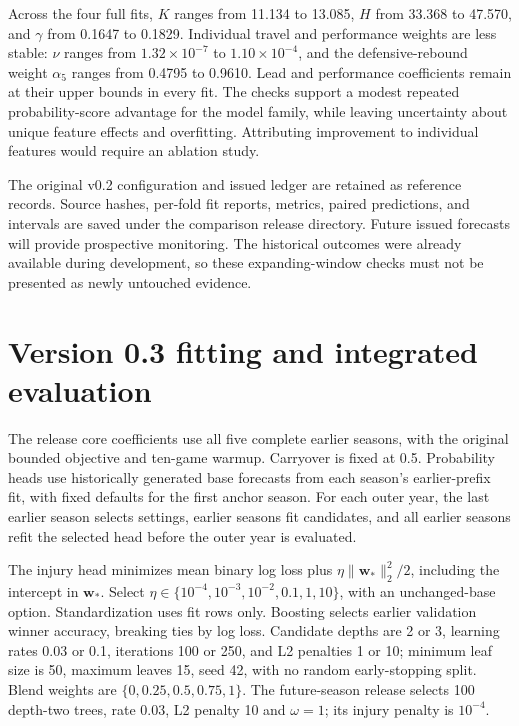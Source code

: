 \documentclass[11pt]{article}
\begin{document}
Across the four full fits, $K$ ranges from 11.134 to 13.085, $H$ from 33.368
to 47.570, and $\gamma$ from 0.1647 to 0.1829. Individual travel and performance
weights are less stable: $\nu$ ranges from $1.32\times10^{-7}$ to
$1.10\times10^{-4}$, and the defensive-rebound weight $\alpha_5$ ranges from
0.4795 to 0.9610. Lead and performance coefficients remain at their upper
bounds in every fit. The checks support a modest repeated probability-score
advantage for the model family, while leaving uncertainty about unique feature
effects and overfitting. Attributing improvement to individual features would
require an ablation study.

The original v0.2 configuration and issued ledger are retained as reference
records. Source hashes, per-fold fit reports, metrics, paired
predictions, and intervals are saved under the comparison release directory.
Future issued forecasts will provide prospective monitoring. The historical
outcomes were already available during development, so these expanding-window
checks must not be presented as newly untouched evidence.

\section{Version 0.3 fitting and integrated evaluation}
The release core coefficients use all five complete earlier seasons, with
the original bounded objective and ten-game warmup. Carryover is fixed at
0.5. Probability heads use historically generated base forecasts from each
season's earlier-prefix fit, with fixed defaults for the first anchor season.
For each outer year, the last earlier season selects settings, earlier
seasons fit candidates, and all earlier seasons refit the selected head
before the outer year is evaluated.

The injury head minimizes mean binary log loss plus
$\eta\|\mathbf w_*\|_2^2/2$, including the intercept in $\mathbf w_*$.
Select $\eta\in\{10^{-4},10^{-3},10^{-2},0.1,1,10\}$, with an unchanged-base
option. Standardization uses fit rows only. Boosting selects earlier
validation winner accuracy, breaking ties by log loss. Candidate depths are
2 or 3, learning rates 0.03 or 0.1, iterations 100 or 250, and L2 penalties
1 or 10; minimum leaf size is 50, maximum leaves 15, seed 42, with no random
early-stopping split. Blend weights are $\{0,0.25,0.5,0.75,1\}$.
The future-season release selects 100 depth-two trees, rate 0.03, L2 penalty
10 and $\omega=1$; its injury penalty is $10^{-4}$.
\end{document}
